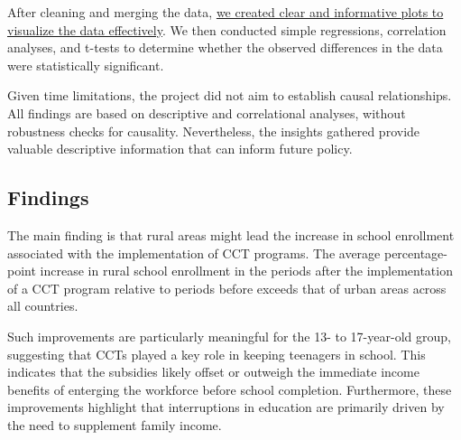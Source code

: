 \documentclass[
  10pt,
]{article}
\begin{document}
After cleaning and merging the data,
\href{./final_project_initial_analysis.qmd}{we created clear and
informative plots to visualize the data effectively}. We then conducted
simple regressions, correlation analyses, and t-tests to determine
whether the observed differences in the data were statistically
significant.

Given time limitations, the project did not aim to establish causal
relationships. All findings are based on descriptive and correlational
analyses, without robustness checks for causality. Nevertheless, the
insights gathered provide valuable descriptive information that can
inform future policy.

\subsection{Findings}\label{findings}

The main finding is that rural areas might lead the increase in school
enrollment associated with the implementation of CCT programs. The
average percentage-point increase in rural school enrollment in the
periods after the implementation of a CCT program relative to periods
before exceeds that of urban areas across all countries.

Such improvements are particularly meaningful for the 13- to 17-year-old
group, suggesting that CCTs played a key role in keeping teenagers in
school. This indicates that the subsidies likely offset or outweigh the
immediate income benefits of enterging the workforce before school
completion. Furthermore, these improvements highlight that interruptions
in education are primarily driven by the need to supplement family
income.
\end{document}
